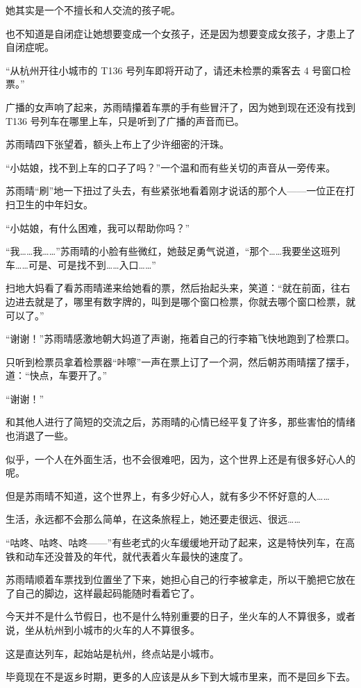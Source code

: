 她其实是一个不擅长和人交流的孩子呢。

也不知道是自闭症让她想要变成一个女孩子，还是因为想要变成女孩子，才患上了自闭症呢。

“从杭州开往小城市的 T136 号列车即将开动了，请还未检票的乘客去 4 号窗口检票。”

广播的女声响了起来，苏雨晴攥着车票的手有些冒汗了，因为她到现在还没有找到 T136 号列车在哪里上车，只是听到了广播的声音而已。

苏雨晴四下张望着，额头上布上了少许细密的汗珠。

“小姑娘，找不到上车的口子了吗？”一个温和而有些关切的声音从一旁传来。

苏雨晴“刷”地一下扭过了头去，有些紧张地看着刚才说话的那个人——一位正在打扫卫生的中年妇女。

“小姑娘，有什么困难，我可以帮助你吗？”

“我……我……”苏雨晴的小脸有些微红，她鼓足勇气说道，“那个……我要坐这班列车……可是、可是找不到……入口……”

扫地大妈看了看苏雨晴递来给她看的票，然后抬起头来，笑道：“就在前面，往右边进去就是了，哪里有数字牌的，叫到是哪个窗口检票，你就去哪个窗口检票，就可以了。”

“谢谢！”苏雨晴感激地朝大妈道了声谢，拖着自己的行李箱飞快地跑到了检票口。

只听到检票员拿着检票器“咔嚓”一声在票上订了一个洞，然后朝苏雨晴摆了摆手，道：“快点，车要开了。”

“谢谢！”

和其他人进行了简短的交流之后，苏雨晴的心情已经平复了许多，那些害怕的情绪也消退了一些。

似乎，一个人在外面生活，也不会很难吧，因为，这个世界上还是有很多好心人的呢。

但是苏雨晴不知道，这个世界上，有多少好心人，就有多少不怀好意的人……

生活，永远都不会那么简单，在这条旅程上，她还要走很远、很远……

“咕咚、咕咚、咕咚——”有些老式的火车缓缓地开动了起来，这是特快列车，在高铁和动车还没普及的年代，就代表着火车最快的速度了。

苏雨晴顺着车票找到位置坐了下来，她担心自己的行李被拿走，所以干脆把它放在了自己的脚边，这样最起码能随时看着它了。

今天并不是什么节假日，也不是什么特别重要的日子，坐火车的人不算很多，或者说，坐从杭州到小城市的火车的人不算很多。

这是直达列车，起始站是杭州，终点站是小城市。

毕竟现在不是返乡时期，更多的人应该是从乡下到大城市里来，而不是回乡下去。

